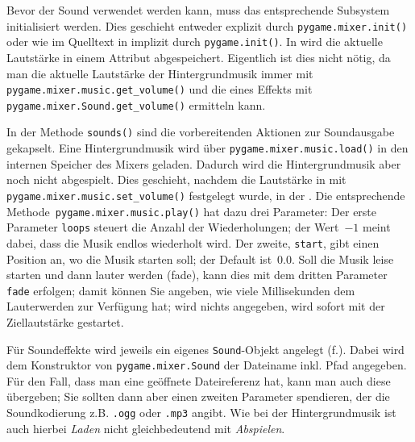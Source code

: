 Bevor der Sound verwendet werden kann, muss das entsprechende Subsystem initialisiert werden. Dies geschieht entweder explizit durch \texttt{pygame.mixer.init()} oder wie im Quelltext in  implizit durch \texttt{pygame.init()}. In  wird die aktuelle Lautstärke in einem Attribut abgespeichert. Eigentlich ist dies nicht nötig, da man die aktuelle Lautstärke der Hintergrundmusik immer mit \texttt{pygame.mixer.music.get\_volume()} und die eines Effekts mit \texttt{pygame.mixer.Sound.get\_volume()} ermitteln kann.

In der Methode \texttt{sounds()} sind die vorbereitenden Aktionen zur Soundausgabe gekapselt. Eine Hintergrundmusik wird über \texttt{pygame.mixer.music.load()} in den internen Speicher des Mixers geladen. Dadurch wird die Hintergrundmusik aber noch nicht abgespielt. Dies geschieht, nachdem die Lautstärke in  mit \texttt{pygame.mixer.music.set\-\_vol\-ume()} festgelegt wurde, in der . Die entsprechende Methode\texttt{ pygame.mixer\-.mu\-sic.play()} hat dazu drei Parameter: Der erste Parameter \texttt{loops} steuert die Anzahl der Wiederholungen; der Wert~$-1$ meint dabei, dass die Musik endlos wiederholt wird. Der zweite, \texttt{start}, gibt einen Position an, wo die Musik starten soll; der Default ist~$0.0$. Soll die Musik leise starten und dann lauter werden (\gls{fade}), kann dies mit dem dritten Parameter \texttt{fade} erfolgen; damit können Sie angeben, wie viele Millisekunden dem Lauterwerden zur Verfügung hat; wird nichts angegeben, wird sofort mit der Ziellautstärke gestartet. 

Für Soundeffekte wird jeweils ein eigenes \texttt{Sound}-Objekt angelegt (f.). Dabei wird dem Konstruktor von \texttt{pygame.mixer.Sound} der Dateiname inkl. Pfad angegeben. Für den Fall, dass man eine geöffnete Dateireferenz hat, kann man auch diese übergeben; Sie sollten dann aber einen zweiten Parameter spendieren, der die Soundkodierung z.B. \texttt{.\gls{ogg}} oder \texttt{.\gls{mp3}} angibt. Wie bei der Hintergrundmusik ist auch hierbei \emph{Laden} nicht gleichbedeutend mit \emph{Abspielen}.

